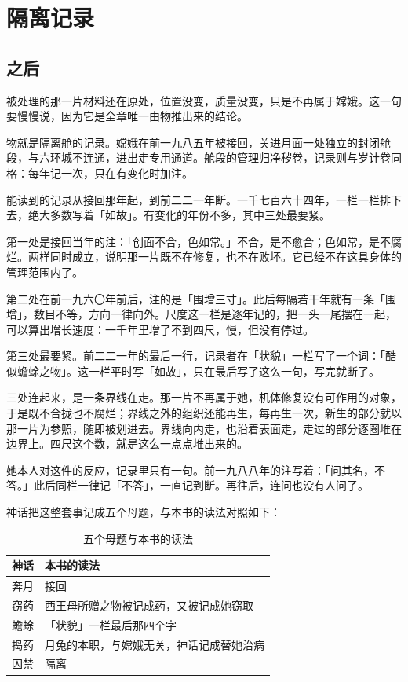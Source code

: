 \chapter{隔离记录}

\section{之后}

被处理的那一片材料还在原处，位置没变，质量没变，只是不再属于嫦娥。这一句要慢慢说，因为它是全章唯一由物推出来的结论。

物就是隔离舱的记录。嫦娥在前一九八五年被接回，关进月面一处独立的封闭舱段，与六环城不连通，进出走专用通道。舱段的管理归净秽卷，记录则与岁计卷同格：每年记一次，只在有变化时加注。

能读到的记录从接回那年起，到前二二一年断。一千七百六十四年，一栏一栏排下去，绝大多数写着「如故」。有变化的年份不多，其中三处最要紧。

第一处是接回当年的注：「创面不合，色如常。」不合，是不愈合；色如常，是不腐烂。两样同时成立，说明那一片既不在修复，也不在败坏。它已经不在这具身体的管理范围内了。

第二处在前一九六〇年前后，注的是「围增三寸」。此后每隔若干年就有一条「围增」，数目不等，方向一律向外。尺度这一栏是逐年记的，把一头一尾摆在一起，可以算出增长速度：一千年里增了不到四尺，慢，但没有停过。

第三处最要紧。前二二一年的最后一行，记录者在「状貌」一栏写了一个词：「酷似蟾蜍之物」。这一栏平时写「如故」，只在最后写了这么一句，写完就断了。

三处连起来，是一条界线在走。那一片不再属于她，机体修复没有可作用的对象，于是既不合拢也不腐烂；界线之外的组织还能再生，每再生一次，新生的部分就以那一片为参照，随即被划进去。界线向内走，也沿着表面走，走过的部分逐圈堆在边界上。四尺这个数，就是这么一点点堆出来的。

她本人对这件的反应，记录里只有一句。前一九八八年的注写着：「问其名，不答。」此后同栏一律记「不答」，一直记到断。再往后，连问也没有人问了。

神话把这整套事记成五个母题，与本书的读法对照如下：

\begin{table}[htbp]
\centering
\caption{五个母题与本书的读法}
\begin{tabular}{@{}ll@{}}
\toprule
神话 & 本书的读法\\
\midrule
奔月 & 接回 \\
窃药 & 西王母所赠之物被记成药，又被记成她窃取 \\
蟾蜍 & 「状貌」一栏最后那四个字 \\
捣药 & 月兔的本职，与嫦娥无关，神话记成替她治病 \\
囚禁 & 隔离 \\
\bottomrule
\end{tabular}
\end{table}

